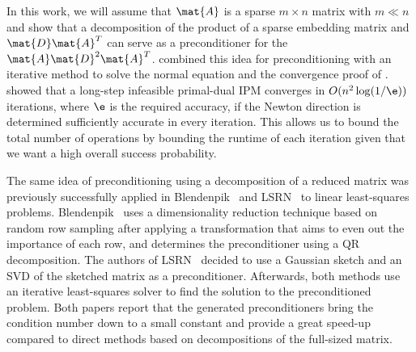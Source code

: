 In this work, we will assume that \(\mat{A}\) is a sparse \(m \times n\) matrix with \(m \ll n\) and show that a decomposition of the product of a sparse embedding matrix and \(\mat{D}\mat{A}^T\) can serve as a preconditioner for the \(\mat{A}\mat{D}^2\mat{A}^T\).
\Textcite{Avron-FasterRandomizedInfeasibleIPMs} combined this idea for preconditioning with an iterative method to solve the normal equation and the convergence proof of \textcite{Monteiro-ConvergenceAnalysisLongStepInfeasibleIPMs}.
\Textcite{Monteiro-ConvergenceAnalysisLongStepInfeasibleIPMs} showed that a long-step infeasible primal-dual IPM converges in \(O(n^2 \log(1/\e))\) iterations, where \(\e\) is the required accuracy, if the Newton direction is determined sufficiently accurate in every iteration.
This allows us to bound the total number of operations by bounding the runtime of each iteration given that we want a high overall success probability.

The same idea of preconditioning using a decomposition of a reduced matrix was previously successfully applied in Blendenpik~\cite{Avron-Blendenpik} and LSRN~\cite{MengSaundersMahoney-LSRN} to linear least-squares problems.
Blendenpik~\cite{Avron-Blendenpik} uses a dimensionality reduction technique based on random row sampling after applying a transformation that aims to even out the importance of each row, and determines the preconditioner using a QR decomposition.
The authors of LSRN~\cite{MengSaundersMahoney-LSRN} decided to use a Gaussian sketch and an SVD of the sketched matrix as a preconditioner.
Afterwards, both methods use an iterative least-squares solver to find the solution to the preconditioned problem.
Both papers report that the generated preconditioners bring the condition number down to a small constant and provide a great speed-up compared to direct methods based on decompositions of the full-sized matrix.

